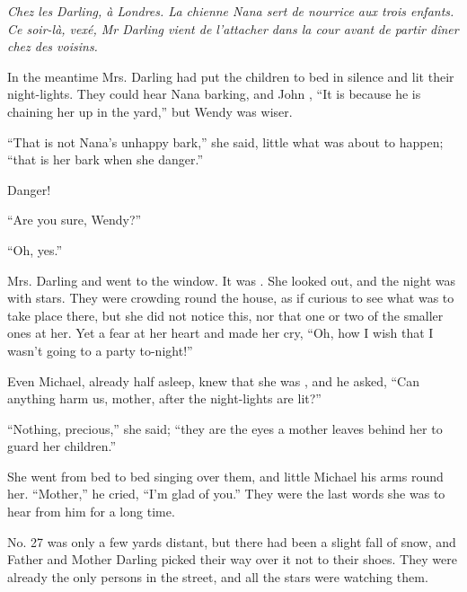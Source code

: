 \documentclass[troisieme]{fiche}
\begin{document}
\noindent\small\textit{Chez les Darling, à Londres. La chienne Nana sert de nourrice aux trois
enfants. Ce soir-là, vexé, Mr Darling vient de l'attacher dans la cour avant de partir dîner
chez des voisins.}\normalsize

\begin{texte}
In the meantime Mrs. Darling had put the children to bed in 
silence and lit their night-lights. They could hear Nana barking, and John
, ``It is because he is chaining her up in the yard,'' but
Wendy was wiser.

``That is not Nana's unhappy bark,'' she said, little  what was about to happen; ``that is her bark when she  danger.''

Danger!

``Are you sure, Wendy?''

``Oh, yes.''

Mrs. Darling  and went to the window. It was
 . She looked
out, and the night was  with stars. They were crowding round
the house, as if curious to see what was to take place there, but she did not notice this, nor
that one or two of the smaller ones  at her. Yet a
 fear  at her heart and made
her cry, ``Oh, how I wish that I wasn't going to a party to-night!''

Even Michael, already half asleep, knew that she was
, and he asked, ``Can anything harm us, mother, after the
night-lights are lit?''

``Nothing, precious,'' she said; ``they are the eyes a mother leaves behind her to guard her
children.''

She went from bed to bed singing 
over them, and little Michael  his arms round her.
``Mother,'' he cried, ``I'm glad of you.'' They were the last words she was to hear from him
for a long time.

No. 27 was only a few yards distant, but there had been a slight fall of snow, and Father and
Mother Darling picked their way over it  not to
 their shoes. They were already the only persons in the street, and
all the stars were watching them.
\end{texte}
\end{document}
